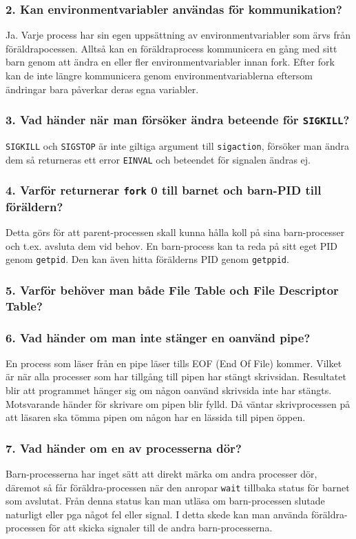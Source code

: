 \documentclass[a4paper]{article}
\begin{document}
\subsubsection*{2. Kan environmentvariabler användas för kommunikation?}
Ja. Varje process har sin egen uppsättning av environmentvariabler som ärvs från föräldrapocessen. Alltså kan en föräldraprocess kommunicera en gång med sitt barn genom att ändra en eller fler environmentvariabler innan fork. Efter fork kan de inte längre kommunicera genom environmentvariablerna eftersom ändringar bara påverkar deras egna variabler.

\subsubsection*{3. Vad händer när man försöker ändra beteende för \texttt{SIGKILL}?}
\texttt{SIGKILL} och \texttt{SIGSTOP} är inte giltiga argument till \texttt{sigaction}, försöker man ändra dem så returneras ett error \texttt{EINVAL} och beteendet för signalen ändras ej.

\subsubsection*{4. Varför returnerar \texttt{fork} 0 till barnet och barn-PID till föräldern?}
Detta görs för att parent-processen skall kunna hålla koll på sina barn-processer och t.ex. avsluta dem vid behov.
En barn-process kan ta reda på sitt eget PID genom \texttt{getpid}. Den kan även hitta förälderns PID genom \texttt{getppid}.

\subsubsection*{5. Varför behöver man både File Table och File Descriptor Table?}

\subsubsection*{6. Vad händer om man inte stänger en oanvänd pipe?}
En process som läser från en pipe läser tills EOF (End Of File) kommer. Vilket är när alla processer som har tillgång till pipen har stängt skrivsidan. Resultatet blir att programmet hänger sig om någon oanvänd skrivsida inte har stängts. Motsvarande händer för skrivare om pipen blir fylld. Då väntar skrivprocessen på att läsaren ska tömma pipen om någon har en lässida till pipen öppen.

\subsubsection*{7. Vad händer om en av processerna dör?}
Barn-processerna har inget sätt att direkt märka om andra processer dör, däremot så får föräldra-processen när den anropar \texttt{wait} tillbaka status för barnet som avslutat. Från denna status kan man utläsa om barn-processen slutade naturligt eller pga något fel eller signal. I detta skede kan man använda föräldra-processen för att skicka signaler till de andra barn-processerna.
\end{document}
